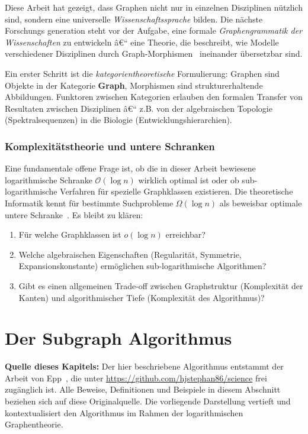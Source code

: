 ﻿\documentclass[12pt,a4paper,twoside]{article}
\theoremstyle{definition}
\theoremstyle{plain}
\theoremstyle{remark}
\begin{document}
Diese Arbeit hat gezeigt, dass Graphen nicht nur in
einzelnen Disziplinen nützlich sind, sondern eine universelle
\emph{Wissenschaftssprache} bilden.  Die nächste Forschungs\-
generation steht vor der Aufgabe, eine formale
\emph{Graphengrammatik der Wissenschaften} zu entwickeln â€“
eine Theorie, die beschreibt, wie Modelle verschiedener
Disziplinen durch Graph-Morphismen~\cite{Ehrig2006}
ineinander übersetzbar sind.

Ein erster Schritt ist die \emph{kategorientheoretische}
Formulierung: Graphen sind Objekte in der Kategorie
\textbf{Graph}, Morphismen sind strukturerhaltende
Abbildungen.  Funktoren zwischen Kategorien erlauben
den formalen Transfer von Resultaten zwischen Disziplinen â€“
z.B. von der algebraischen Topologie (Spektralsequenzen)
in die Biologie (Entwicklungshierarchien).

\subsubsection{Komplexitätstheorie und untere Schranken}

Eine fundamentale offene Frage ist, ob die in dieser Arbeit
bewiesene logarithmische Schranke $\mathcal{O}(\log n)$
wirklich optimal ist oder ob sub-logarithmische Verfahren
für spezielle Graphklassen existieren.  Die theoretische
Informatik kennt für bestimmte Suchprobleme
$\Omega(\log n)$ als beweisbar optimale untere Schranke~\cite{Hromkovic2004}.
Es bleibt zu klären:
\begin{enumerate}
	\item Für welche Graphklassen ist $o(\log n)$ erreichbar?
	\item Welche algebraischen Eigenschaften (Regularität,
	Symmetrie, Expansionskonstante) ermöglichen
	sub-logarithmische Algorithmen?
	\item Gibt es einen allgemeinen Trade-off zwischen
	Graphstruktur (Komplexität der Kanten) und
	algorithmischer Tiefe (Komplexität des Algorithmus)?
\end{enumerate}


\section{Der Subgraph Algorithmus}
\label{sec:subgraph_algo}

\textbf{Quelle dieses Kapitels:}
Der hier beschriebene Algorithmus entstammt der Arbeit von
Epp~\cite{Epp2026}, die unter
\url{https://github.com/hjstephan86/science} frei zugänglich ist.
Alle Beweise, Definitionen und Beispiele in diesem Abschnitt
beziehen sich auf diese Originalquelle.  Die vorliegende Darstellung
vertieft und kontextualisiert den Algorithmus im Rahmen der
logarithmischen Graphentheorie.
\end{document}
